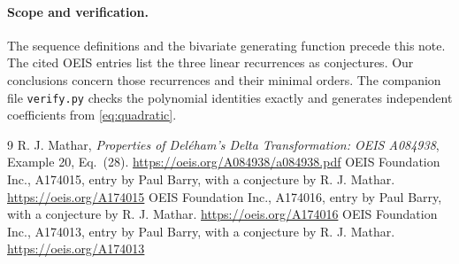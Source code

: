 \documentclass[11pt]{article}
\begin{document}
\paragraph{Scope and verification.}
The sequence definitions and the bivariate generating function precede this note. The cited OEIS entries list the three linear recurrences as conjectures. Our conclusions concern those recurrences and their minimal orders. The companion file \texttt{verify.py} checks the polynomial identities exactly and generates independent coefficients from \eqref{eq:quadratic}.

\begin{thebibliography}{9}
 R. J. Mathar, \emph{Properties of Del\'eham's Delta Transformation: OEIS A084938}, Example 20, Eq.~(28). \url{https://oeis.org/A084938/a084938.pdf}
 OEIS Foundation Inc., A174015, entry by Paul Barry, with a conjecture by R. J. Mathar. \url{https://oeis.org/A174015}
 OEIS Foundation Inc., A174016, entry by Paul Barry, with a conjecture by R. J. Mathar. \url{https://oeis.org/A174016}
 OEIS Foundation Inc., A174013, entry by Paul Barry, with a conjecture by R. J. Mathar. \url{https://oeis.org/A174013}
\end{thebibliography}
\end{document}
